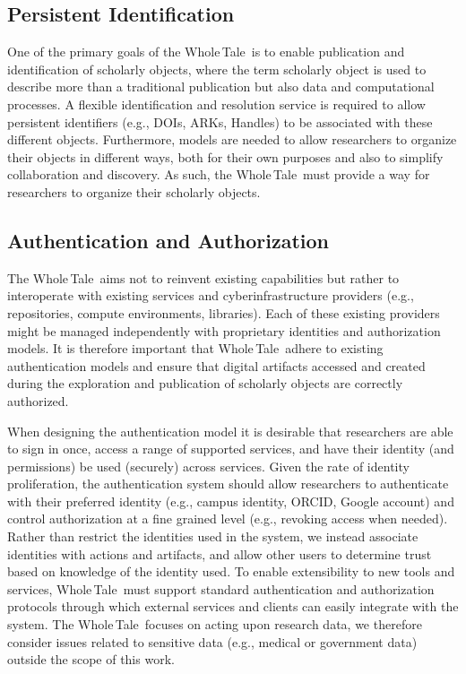\documentclass[review]{elsarticle}
\newcommand{\wt}{Whole\,Tale}
\begin{document}
\subsection{Persistent Identification} 
One of the primary goals of the \wt\ is to enable publication and identification
of scholarly objects, where the term scholarly object is used to describe more than a traditional publication but also
data and computational processes. A flexible identification and resolution service
is required to allow persistent identifiers (e.g., DOIs, ARKs, Handles) to be associated with these
different objects. 
Furthermore, models are needed to allow
researchers to organize their objects in different ways, both for their own purposes and
also to simplify collaboration and discovery. As such, the \wt\ must provide a way for researchers to organize their scholarly objects. 


\subsection{Authentication and Authorization}
The \wt\ aims not to reinvent existing capabilities but rather
to interoperate with existing services
and cyberinfrastructure providers
(e.g., repositories, compute environments, libraries). Each of these existing providers
might be managed independently with proprietary identities and authorization models. 
It is therefore important that \wt\ adhere to existing authentication
models and ensure that digital artifacts accessed and created during the exploration 
and publication of scholarly objects are correctly authorized. 

When designing the authentication model it is desirable that researchers 
are able to sign in once, 
access a range of supported services, and have their identity (and permissions) 
be used (securely) across services. 
Given the rate of identity proliferation, the authentication system should allow
researchers to authenticate with their preferred identity (e.g., campus identity, 
ORCID, Google account)
and control authorization at a fine grained level (e.g., revoking access
when needed). 
Rather than restrict the identities used in the system, we instead associate identities with actions and artifacts, and allow other users to determine 
trust based on knowledge of the identity used.
To enable extensibility to new tools and services, \wt\ must support standard authentication
and authorization protocols through which external services and clients can easily integrate
with the system.
The \wt\ focuses on acting upon research data, we therefore consider 
issues related to sensitive data (e.g., medical or government data) outside
the scope of this work.
\end{document}
